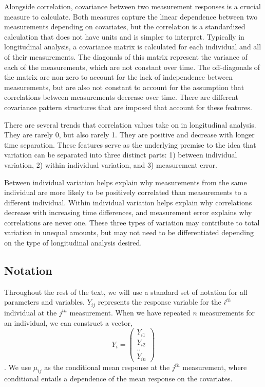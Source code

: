 \documentclass[12pt, twoside]{amherstthesis}
\theoremstyle{definition}
\theoremstyle{definition}
\theoremstyle{definition}
\theoremstyle{remark}
\begin{document}
Alongside correlation, covariance between two measurement responses is a crucial measure to calculate. Both measures capture the linear dependence between two measurements depending on covariates, but the correlation is a standardized calculation that does not have units and is simpler to interpret. Typically in longitudinal analysis, a covariance matrix is calculated for each individual and all of their measurements. The diagonals of this matrix represent the variance of each of the measurements, which are not constant over time. The off-diagonals of the matrix are non-zero to account for the lack of independence between measurements, but are also not constant to account for the assumption that correlations between measurements decrease over time. There are different covariance pattern structures that are imposed that account for these features.

There are several trends that correlation values take on in longitudinal analysis. They are rarely 0, but also rarely 1. They are positive and decrease with longer time separation. These features serve as the underlying premise to the idea that variation can be separated into three distinct parts: 1) between individual variation, 2) within individual variation, and 3) measurement error.

Between individual variation helps explain why measurements from the same individual are more likely to be positively correlated than measurements to a different individual. Within individual variation helps explain why correlations decrease with increasing time differences, and measurement error explains why correlations are never one. These three types of variation may contribute to total variation in unequal amounts, but may not need to be differentiated depending on the type of longitudinal analysis desired.

\hypertarget{notation}{%
\subsection{Notation}\label{notation}}

Throughout the rest of the text, we will use a standard set of notation for all parameters and variables. \(Y_{ij}\) represents the response variable for the \(i^{th}\) individual at the \(j^{th}\) measurement. When we have repeated \(n\) measurements for an individual, we can construct a vector, \[Y_i = \begin{pmatrix} Y_{i1}\\ Y_{i2} \\ .. \\  Y_{in}  \end{pmatrix}\]. We use \(\mu_{ij}\) as the conditional mean response at the \(j^{th}\) measurement, where conditional entails a dependence of the mean response on the covariates.
\end{document}
